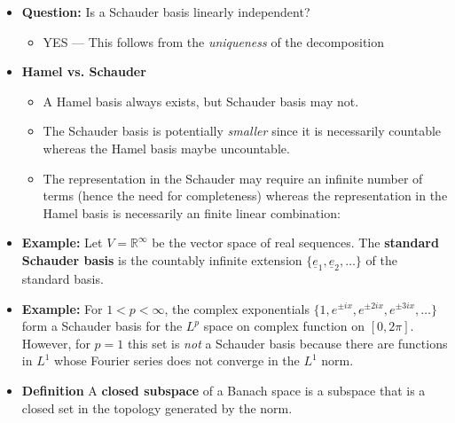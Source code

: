 \documentclass[11pt,twoside]{report}
\newcommand{\vecnot}{\underline}
\begin{document}
\begin{itemize}
\item \textbf{Question:} Is a Schauder basis linearly independent? 
\begin{itemize}
\item 
YES --- This follows from the  \emph{uniqueness} of the decomposition 
\end{itemize}



\item  \textbf{Hamel vs. Schauder} 
\begin{itemize}
\item A Hamel basis always exists, but Schauder basis may not.
\item  The Schauder basis is potentially  \emph{smaller} since it is necessarily countable whereas the Hamel basis maybe uncountable.
\item  The representation in the   Schauder may require an infinite number of terms (hence the need for completeness) whereas the representation in the Hamel basis is necessarily an finite linear combination: 
\end{itemize}

\item \textbf{Example:} Let $V = \mathbb{R}^\infty$ be the vector space of real sequences.
The \textbf{standard Schauder basis} is the countably infinite extension $\{\vecnot{e}_1 ,\vecnot{e}_2, \ldots \}$ of the standard basis.


\item \textbf{Example:}  For $1 < p < \infty$, the complex exponentials $\{ 1, e^{\pm ix}, e^{ \pm 2ix} , e^{ \pm 3 ix} , \dots\}$ form a  Schauder basis for the $L^p$ space on complex function on $[0, 2 \pi]$. However, for $p =1$ this set is \emph{not} a  Schauder basis because there are functions in $L^1$ whose Fourier series does not converge in the $L^1$ norm. 

\item \textbf{Definition}  A \textbf{closed subspace} of a Banach space is a subspace that is a closed set in the topology generated by the norm.



\end{itemize}
\end{document}
